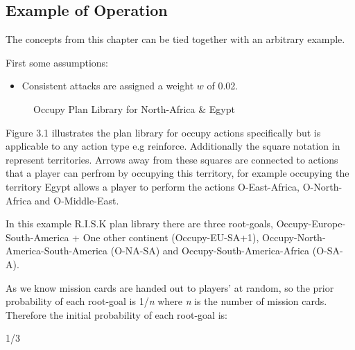\documentclass[parskip]{cs4rep}
\begin{document}
\subsection{Example of Operation}

The concepts from this chapter can be tied together with an arbitrary example.

First some assumptions:

\begin{itemize}
\item
Consistent attacks are assigned a weight $w$ of 0.02.
\end{itemize}

\begin{figure}[h]
\caption{Occupy Plan Library for North-Africa \& Egypt}
\end{figure}

Figure 3.1 illustrates the plan library for occupy actions specifically but is applicable to any action type e.g reinforce. Additionally the square notation in represent territories. Arrows away from these squares are connected to actions that a player can perfrom by occupying this territory, for example occupying the territory Egypt allows a player to perform the actions O-East-Africa, O-North-Africa and O-Middle-East.

In this example R.I.S.K plan library there are three root-goals, Occupy-Europe-South-America + One other continent (Occupy-EU-SA+1), Occupy-North-America-South-America (O-NA-SA) and Occupy-South-America-Africa (O-SA-A). 

As we know mission cards are handed out to players' at random, so the prior probability of each root-goal is 1/\textit{n} where \textit{n} is the number of mission cards. Therefore the initial probability of each root-goal is:

1/3
\end{document}
